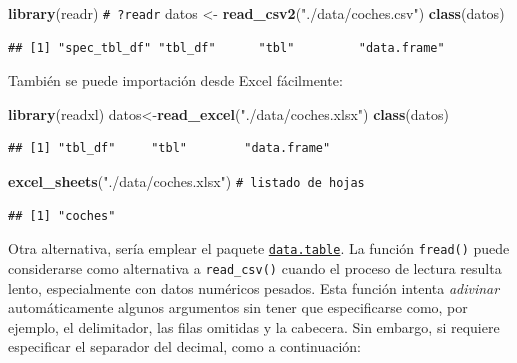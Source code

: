 \documentclass[
]{book}
\newenvironment{Shaded}{\begin{snugshade}}{\end{snugshade}}
\newcommand{\CommentTok}[1]{\textcolor[rgb]{0.56,0.35,0.01}{\textit{#1}}}
\newcommand{\FunctionTok}[1]{\textcolor[rgb]{0.13,0.29,0.53}{\textbf{#1}}}
\newcommand{\NormalTok}[1]{#1}
\newcommand{\OtherTok}[1]{\textcolor[rgb]{0.56,0.35,0.01}{#1}}
\newcommand{\StringTok}[1]{\textcolor[rgb]{0.31,0.60,0.02}{#1}}
\theoremstyle{break}
\theoremstyle{nonumberplain}
\renewcommand{\CommentTok}[1]{\textcolor[rgb]{0.41,0.41,0.41}{\texttt{#1}}}
\begin{document}
\begin{Shaded}
\begin{Highlighting}[]
\FunctionTok{library}\NormalTok{(readr)}
\CommentTok{\# ?readr}
\NormalTok{datos }\OtherTok{\textless{}{-}} \FunctionTok{read\_csv2}\NormalTok{(}\StringTok{"./data/coches.csv"}\NormalTok{)}
\FunctionTok{class}\NormalTok{(datos) }
\end{Highlighting}
\end{Shaded}

\begin{verbatim}
## [1] "spec_tbl_df" "tbl_df"      "tbl"         "data.frame"
\end{verbatim}

También se puede importación desde Excel fácilmente:

\begin{Shaded}
\begin{Highlighting}[]
\FunctionTok{library}\NormalTok{(readxl)}
\NormalTok{datos}\OtherTok{\textless{}{-}}\FunctionTok{read\_excel}\NormalTok{(}\StringTok{"./data/coches.xlsx"}\NormalTok{)}
\FunctionTok{class}\NormalTok{(datos)}
\end{Highlighting}
\end{Shaded}

\begin{verbatim}
## [1] "tbl_df"     "tbl"        "data.frame"
\end{verbatim}

\begin{Shaded}
\begin{Highlighting}[]
\FunctionTok{excel\_sheets}\NormalTok{(}\StringTok{"./data/coches.xlsx"}\NormalTok{) }\CommentTok{\# listado de hojas}
\end{Highlighting}
\end{Shaded}

\begin{verbatim}
## [1] "coches"
\end{verbatim}

Otra alternativa, sería emplear el paquete \href{https://r-datatable.com}{\texttt{data.table}}.
La función \texttt{fread()} puede considerarse como alternativa a \texttt{read\_csv()}
cuando el proceso de lectura resulta lento, especialmente con datos numéricos pesados. Esta función intenta \emph{adivinar} automáticamente algunos argumentos sin tener que especificarse como, por ejemplo, el delimitador, las filas omitidas y la cabecera. Sin embargo, si requiere especificar el separador del decimal, como a continuación:
\end{document}
